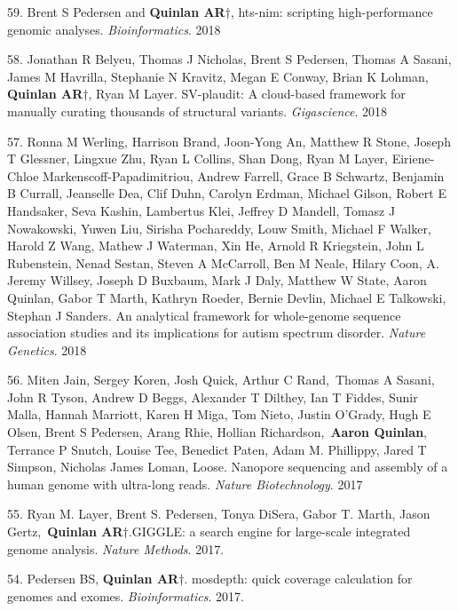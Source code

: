\documentclass[margin,line]{cv}
\begin{document}
\begin{resume}
\begin{list}{*}{}
    \item[59.] Brent S Pedersen and \textbf{Quinlan AR}$\dagger$, hts-nim: scripting high-performance genomic analyses. \emph{Bioinformatics}. 2018

    \item[58.] Jonathan R Belyeu, Thomas J Nicholas, Brent S Pedersen, Thomas A Sasani, James M Havrilla, Stephanie N Kravitz, Megan E Conway, Brian K Lohman, \textbf{Quinlan AR}$\dagger$, Ryan M Layer. SV-plaudit: A cloud-based framework for manually curating thousands of structural variants. \emph{Gigascience}. 2018

    \item[57.] Ronna M Werling, Harrison Brand, Joon-Yong An, Matthew R Stone, Joseph T Glessner, Lingxue Zhu, Ryan L Collins, Shan Dong, Ryan M Layer, Eiriene-Chloe Markenscoff-Papadimitriou, Andrew Farrell, Grace B Schwartz, Benjamin B Currall, Jeanselle Dea, Clif Duhn, Carolyn Erdman, Michael Gilson, Robert E Handsaker, Seva Kashin, Lambertus Klei, Jeffrey D Mandell, Tomasz J Nowakowski, Yuwen Liu, Sirisha Pochareddy, Louw Smith, Michael F Walker, Harold Z Wang, Mathew J Waterman, Xin He, Arnold R Kriegstein, John L Rubenstein, Nenad Sestan, Steven A McCarroll, Ben M Neale, Hilary Coon, A. Jeremy Willsey, Joseph D Buxbaum, Mark J Daly, Matthew W State, Aaron Quinlan, Gabor T Marth, Kathryn Roeder, Bernie Devlin, Michael E Talkowski, Stephan J Sanders.
    An analytical framework for whole-genome sequence association studies and its implications for autism spectrum disorder. \emph{Nature Genetics}. 2018

    \item[56.] Miten Jain, Sergey Koren, Josh Quick, Arthur C Rand, Thomas A Sasani, John R Tyson, Andrew D Beggs, Alexander T Dilthey, Ian T Fiddes, Sunir Malla, Hannah Marriott, Karen H Miga, Tom Nieto, Justin O'Grady, Hugh E Olsen, Brent S Pedersen, Arang Rhie, Hollian Richardson, \textbf{Aaron Quinlan}, Terrance P Snutch, Louise Tee, Benedict Paten, Adam M. Phillippy, Jared T Simpson, Nicholas James Loman, Loose. 
    Nanopore sequencing and assembly of a human genome with ultra-long reads. \emph{Nature Biotechnology}. 2017

    \item[55.] Ryan M. Layer, Brent S. Pedersen, Tonya DiSera, Gabor T. Marth, Jason Gertz, \textbf{Quinlan AR}$\dagger$.GIGGLE: a search engine for large-scale integrated genome analysis. \emph{Nature Methods}. 2017.

    \item[54.] Pedersen BS, \textbf{Quinlan AR}$\dagger$.
    mosdepth: quick coverage calculation for genomes and exomes. \emph{Bioinformatics}. 2017. 


\end{list}
\end{resume}
\end{document}
